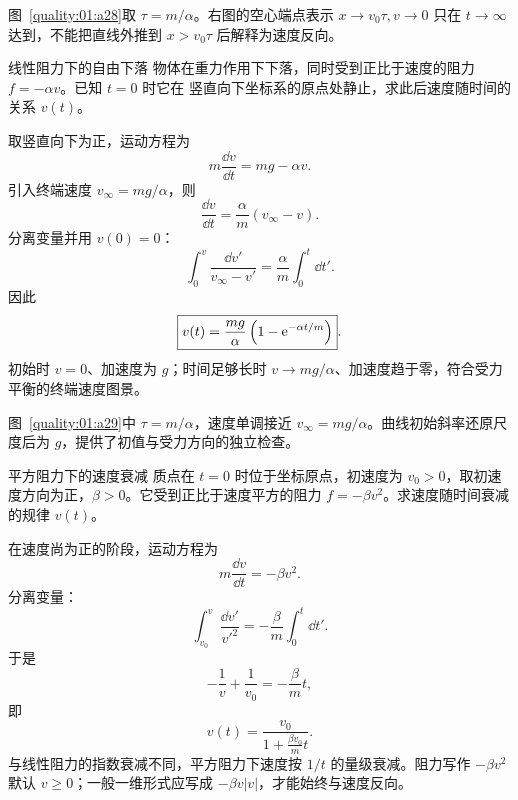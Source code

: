 {\begin{xesolution}

图~\ref{quality:01:a28}取 $\tau=m/\alpha$。右图的空心端点表示 $x\to v_0\tau,v\to0$ 只在 $t\to\infty$ 达到，不能把直线外推到 $x>v_0\tau$ 后解释为速度反向。
\end{xesolution}

\begin{origexamplebox}{线性阻力下的自由下落}\label{ch01:ex:s15-1-24}
物体在重力作用下下落，同时受到正比于速度的阻力 $f=-\alpha v$。已知 $t=0$ 时它在
竖直向下坐标系的原点处静止，求此后速度随时间的关系 $v(t)$。

\end{origexamplebox}

\begin{xesolution}
取竖直向下为正，运动方程为
\[
 m\frac{\dd v}{\dd t}=mg-\alpha v.
\]
引入终端速度 $v_\infty=mg/\alpha$，则
\[
 \frac{\dd v}{\dd t}=\frac\alpha m(v_\infty-v).
\]
分离变量并用 $v(0)=0$：
\[
 \int_0^v\frac{\dd v'}{v_\infty-v'}
 =\frac\alpha m\int_0^t\dd t'.
\]
因此
\[
 \boxed{v(t)=\frac{mg}{\alpha}
 \left(1-\mathrm e^{-\alpha t/m}\right)}.
\]
初始时 $v=0$、加速度为 $g$；时间足够长时 $v\to mg/\alpha$、加速度趋于零，符合受力
平衡的终端速度图景。


图~\ref{quality:01:a29}中 $\tau=m/\alpha$，速度单调接近 $v_\infty=mg/\alpha$。曲线初始斜率还原尺度后为 $g$，提供了初值与受力方向的独立检查。
\end{xesolution}

\begin{origexamplebox}{平方阻力下的速度衰减}\label{ch01:ex:s15-1-25}
质点在 $t=0$ 时位于坐标原点，初速度为 $v_0>0$，取初速度方向为正，$\beta>0$。它受到正比于速度平方的阻力
$f=-\beta v^2$。求速度随时间衰减的规律 $v(t)$。

\end{origexamplebox}

\begin{xesolution}
在速度尚为正的阶段，运动方程为
\[
 m\frac{\dd v}{\dd t}=-\beta v^2.
\]
分离变量：
\[
 \int_{v_0}^{v}\frac{\dd v'}{v'^2}
 =-\frac\beta m\int_0^t\dd t'.
\]
于是
\[
 -\frac1v+\frac1{v_0}=-\frac\beta m t,
\]
即
\[
 \boxed{v(t)=\frac{v_0}{1+\frac{\beta v_0}{m}t}}.
\]
与线性阻力的指数衰减不同，平方阻力下速度按 $1/t$ 的量级衰减。阻力写作
$-\beta v^2$ 默认 $v\ge0$；一般一维形式应写成 $-\beta v|v|$，才能始终与速度反向。


\end{xesolution}}
